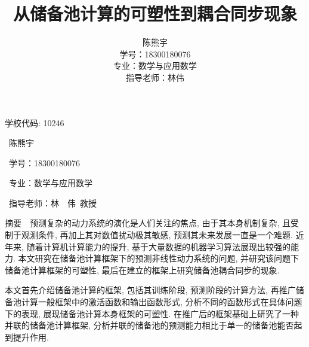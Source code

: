 \documentclass[notitlepage,cs4size,punct,oneside]{ctexrep}
\title{{\zihao{-1}\heiti{} 从储备池计算的可塑性到耦合同步现象}}
\author{陈熊宇\\学号：18300180076\\专业：数学与应用数学\\指导老师：林伟}
\date{}
\numberwithin{equation}{chapter}
\theoremstyle{mystyle}
\begin{document}
\CTEXoptions[contentsname={\heiti{目\ \ \ \ \ \ 录}}]
\CTEXoptions[abstractname={摘要：}]
\CTEXoptions[bibname={\heiti 参考文献}]

\renewcommand{\thepage}{\roman{page}}

\setcounter{page}{0}

\tableofcontents

\clearpage

\hfill{学校代码: 10246}

\bigskip

\bigskip
\bigskip
\bigskip
{}
\bigskip

\bigskip
\begin{center}
{\ 陈熊宇}

\bigskip

{\ 学号：18300180076}

\bigskip

{\ 专业：数学与应用数学}

\bigskip

{\ 指导老师：林\ \ 伟\ 教授}
\end{center}
\thispagestyle{empty}\setcounter{page}{0}


\clearpage
{\heiti 摘要\ \ }预测复杂的动力系统的演化是人们关注的焦点, 由于其本身机制复杂, 且受制于观测条件, 
再加上其对数值扰动极其敏感, 预测其未来发展一直是一个难题. 
近年来, 随着计算机计算能力的提升, 基于大量数据的机器学习算法展现出较强的能力. 
本文研究在储备池计算框架下的预测非线性动力系统的问题, 
并研究该问题下储备池计算框架的可塑性, 最后在建立的框架上研究储备池耦合同步的现象. %

本文首先介绍储备池计算的框架, 包括其训练阶段, 预测阶段的计算方法, 
再推广储备池计算一般框架中的激活函数和输出函数形式, 分析不同的函数形式在具体问题下的表现, 
展现储备池计算本身框架的可塑性. 在推广后的框架基础上研究了一种并联的储备池计算框架, 
分析并联的储备池的预测能力相比于单一的储备池能否起到提升作用. %
\end{document}
